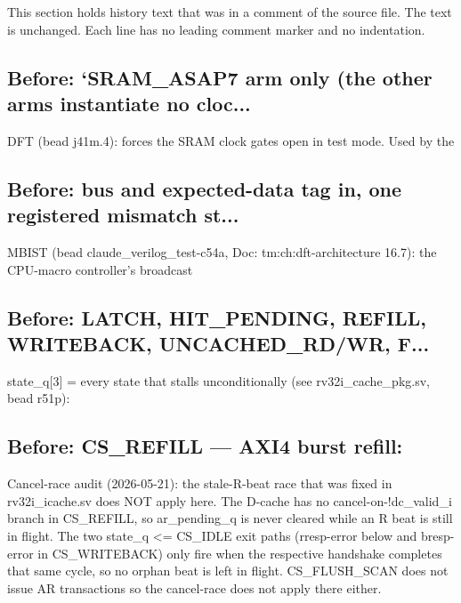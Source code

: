 This section holds history text that was in a comment of the source file. The text is unchanged. Each line has no leading comment marker and no indentation.

\begin{record}

\subsection*{Before: `SRAM\_ASAP7 arm only (the other arms instantiate no cloc...}

\begin{textblock}
DFT (bead j41m.4): forces the SRAM clock gates open in test mode. Used by the
\end{textblock}

\subsection*{Before: bus and expected-data tag in, one registered mismatch st...}

\begin{textblock}
MBIST (bead claude_verilog_test-c54a, Doc: tm:ch:dft-architecture 16.7): the CPU-macro controller's broadcast
\end{textblock}

\subsection*{Before: LATCH, HIT\_PENDING, REFILL, WRITEBACK, UNCACHED\_RD/WR, F...}

\begin{textblock}
state_q[3] = every state that stalls unconditionally (see rv32i_cache_pkg.sv, bead r51p):
\end{textblock}

\subsection*{Before: CS\_REFILL — AXI4 burst refill:}

\begin{textblock}
Cancel-race audit (2026-05-21): the stale-R-beat race that was
fixed in rv32i_icache.sv does NOT apply here.  The D-cache has
no cancel-on-!dc_valid_i branch in CS_REFILL, so ar_pending_q
is never cleared while an R beat is still in flight.  The two
state_q <= CS_IDLE exit paths (rresp-error below and bresp-error
in CS_WRITEBACK) only fire when the respective handshake
completes that same cycle, so no orphan beat is left in flight.
CS_FLUSH_SCAN does not issue AR transactions so the cancel-race
does not apply there either.
\end{textblock}

\end{record}

